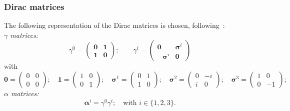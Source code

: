 \subsubsection*{Dirac matrices}
The following representation of the Dirac matrices is chosen, following~\cite{peskin1995}:\\
\textit{$\gamma$ matrices:}\\[-10pt]
\begin{equation}
\gamma^0 =
\begin{pmatrix}
\boldsymbol{0}&\boldsymbol{1}\\
\boldsymbol{1}&\boldsymbol{0}
\end{pmatrix};\qquad
\gamma^{i} = 
\begin{pmatrix}
\boldsymbol{0}&\boldsymbol{\sigma}^i\\
-\boldsymbol{\sigma}^i&\boldsymbol{0}
\end{pmatrix}
\end{equation}
with\\[-10pt]
\begin{equation}
\boldsymbol{0}=
\begin{pmatrix}
0&0\\0&0
\end{pmatrix};\quad
\boldsymbol{1}=
\begin{pmatrix}
1&0\\0&1
\end{pmatrix};\quad
\boldsymbol{\sigma}^1=
\begin{pmatrix}
0&1\\1&0
\end{pmatrix};\quad
\boldsymbol{\sigma}^2=
\begin{pmatrix}
0&-i\\i&0
\end{pmatrix};\quad
\boldsymbol{\sigma}^3=
\begin{pmatrix}
1&0\\0&-1
\end{pmatrix};\quad
\end{equation}
\textit{$\alpha$ matrices:}
\begin{equation}
\boldsymbol{\alpha}^i = \gamma^0 \gamma^i;\quad\text{with }i \in \{1,2,3\}.
\end{equation}

